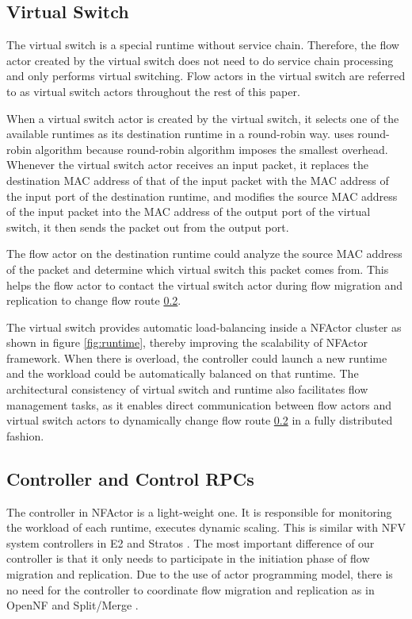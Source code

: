 \subsection{Virtual Switch}

The virtual switch is a special runtime without service chain. Therefore, the flow actor created by the virtual switch does not need to do service chain processing and only performs virtual switching. Flow actors in the virtual switch are referred to as virtual switch actors throughout the rest of this paper.

When a virtual switch actor is created by the virtual switch, it selects one of the available runtimes as its destination runtime in a round-robin way. \nfactor uses round-robin algorithm because round-robin algorithm imposes the smallest overhead. Whenever the virtual switch actor receives an input packet, it replaces the destination MAC address of that of the input packet with the MAC address of the input port of the destination runtime, and modifies the source MAC address of the input packet into the MAC address of the output port of the virtual switch, it then sends the packet out from the output port.

The flow actor on the destination runtime could analyze the source MAC address of the packet and determine which virtual switch this packet comes from. This helps the flow actor to contact the virtual switch actor during flow migration and replication to change flow route \ref{}.

The virtual switch provides automatic load-balancing inside a NFActor cluster as shown in figure \ref{fig:runtime}, thereby improving the scalability of NFActor framework. When there is overload, the controller could launch a new runtime and the workload could be automatically balanced on that runtime. The architectural consistency of virtual switch and runtime also facilitates flow management tasks, as it enables direct communication between flow actors and virtual switch actors to dynamically change flow route \ref{} in a fully distributed fashion.

\subsection{Controller and Control RPCs}


The controller in NFActor is a light-weight one. It is responsible for monitoring the workload of each runtime, executes dynamic scaling. This is similar with NFV system controllers in E2 \cite{palkar2015e2} and Stratos \cite{gember2012stratos}. The most important difference of our controller is that it only needs to participate in the initiation phase of flow migration and replication. Due to the use of actor programming model, there is no need for the controller to coordinate flow migration and replication as in OpenNF \cite{gember2015opennf} and Split/Merge \cite{rajagopalan2013split}.

